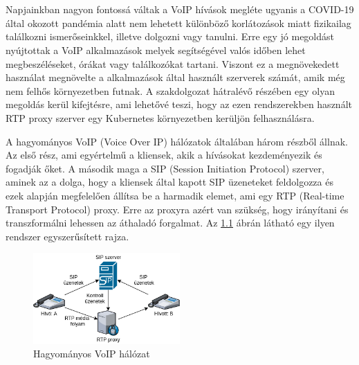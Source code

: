 \chapter{\bevezetes}

Napjainkban nagyon fontossá váltak a VoIP hívások megléte ugyanis a COVID-19 által okozott
pandémia alatt nem lehetett különböző korlátozások miatt fizikailag találkozni 
ismerőseinkkel, illetve dolgozni vagy tanulni. Erre egy jó megoldást nyújtottak a VoIP 
alkalmazások melyek segítségével valós időben lehet megbeszéléseket, órákat vagy 
találkozókat tartani. Viszont ez a megnövekedett használat megnövelte a alkalmazások 
által használt szerverek számát, amik még nem felhős környezetben futnak. A szakdolgozat 
hátralévő részében egy olyan megoldás kerül kifejtésre, ami lehetővé teszi, hogy az ezen 
rendszerekben használt RTP proxy szerver egy Kubernetes környezetben kerüljön 
felhasználásra. 

A hagyományos VoIP (Voice Over IP) hálózatok általában három részből állnak.
Az első rész, ami egyértelmű a kliensek, akik a hívásokat kezdeményezik és 
fogadják őket. A második maga a SIP (Session Initiation Protocol) szerver, aminek
az a dolga, hogy a kliensek által kapott SIP üzeneteket feldolgozza és ezek alapján
megfelelően állítsa be a harmadik elemet, ami egy RTP (Real-time Transport Protocol) 
proxy. Erre az proxyra azért van szükség, hogy irányítani és transzformálni lehessen az 
áthaladó forgalmat. Az \ref{fig:tradVoIP} ábrán látható egy ilyen rendszer egyszerűsített 
rajza.

\begin{figure}[!ht]
	\centering
	\includegraphics[width=0.5\textwidth, keepaspectratio]{figures/traditional_voip.png}
	\caption{Hagyományos VoIP hálózat}
	\label{fig:tradVoIP}
\end{figure}

